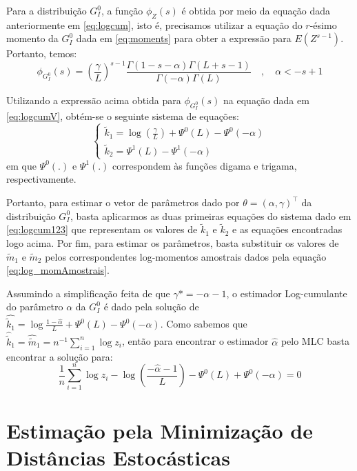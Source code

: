 \documentclass[12pt]{article}
\begin{document}
Para a distribuição $G_I^0$, a função $\phi_{Z}(s)$ é obtida por meio da equação dada anteriormente em \eqref{eq:logcum}, isto é, precisamos utilizar a equação do $r$-ésimo momento da $G_I^0$ dada em \eqref{eq:moments} para obter a expressão para $E(Z^{s-1})$. Portanto, temos:
\begin{equation}
    \phi_{G_I^0}(s) = \left ( \frac{\gamma}{L} \right )^{s-1}\frac{\Gamma(1-s-\alpha)\Gamma(L+s-1)}{\Gamma(-\alpha)\Gamma(L)} \quad , \quad \alpha < -s+1
\end{equation}

Utilizando a expressão acima obtida para $\phi_{G_I^0}(s)$ na equação dada em \eqref{eq:logcumV}, obtém-se o seguinte sistema de equações:
\begin{equation}
    \left\{\begin{matrix}
        \tilde{k}_{1} = \log \left ( \frac{\gamma}{L} \right ) + \Psi^{0}(L) - \Psi^{0}(-\alpha)  \\ 
        \tilde{k}_{2} = \Psi^{1}(L) - \Psi^{1}(-\alpha)
    \end{matrix}\right.
\end{equation}
em que $\Psi^{0}(.)$ e $\Psi^{1}(.)$ correspondem às funções digama e trigama, respectivamente.

Portanto, para estimar o vetor de parâmetros dado por $\theta = (\alpha, \gamma)^{\top}$ da distribuição $G_I^0$, basta aplicarmos as duas primeiras equações do sistema dado em \eqref{eq:logcum123} que representam os valores de $\tilde{k}_{1}$ e $\tilde{k}_{2}$ e as equações encontradas logo acima. Por fim, para estimar os parâmetros, basta substituir os valores de $\tilde{m}_{1}$ e $\tilde{m}_{2}$ pelos correspondentes log-momentos amostrais dados pela equação \eqref{eq:log_momAmostrais}. 

Assumindo a simplificação feita de que $\gamma* = -\alpha - 1$, o estimador Log-cumulante do parâmetro $\alpha$ da $G_I^0$ é dado pela solução de $\widehat{\tilde{k}_{1}} = \log \frac{1-\widehat{\alpha}}{L} + \Psi^{0}(L) - \Psi^{0}(-\alpha)$. Como sabemos que $\widehat{\tilde{k}}_{1} = \widehat{\tilde{m}}_{1} = n^{-1}\sum_{i=1}^{n}\log z_i$, então para encontrar o estimador $\widehat{\alpha}$ pelo MLC basta encontrar a solução para:
\begin{equation}
    \frac{1}{n}\sum_{i=1}^{n}\log z_i - \log \left ( \frac{-\widehat{\alpha}-1}{L} \right ) - \Psi^{0}(L) + \Psi^{0}(-\alpha) = 0
    \label{eq:alphaEst_logCum}
\end{equation}

\section{Estimação pela Minimização de Distâncias Estocásticas}
\end{document}
